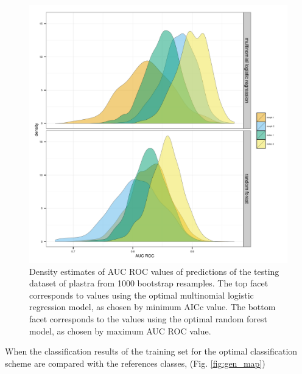 \documentclass[12pt]{article}\usepackage{graphicx, color}
\begin{document}
\begin{figure}[ht]
  \centering
  \includegraphics[width = \textwidth]{figure/gen_res}
  \caption{Density estimates of AUC ROC values of predictions of the testing dataset of plastra from 1000 bootstrap resamples. The top facet corresponds to values using the optimal multinomial logistic regression model, as chosen by minimum AICc value. The bottom facet corresponds to the values using the optimal random forest model, as chosen by maximum AUC ROC value.}
  \label{fig:gen_res}
\end{figure}

When the classification results of the training set for the optimal classification scheme are compared with the references classes, (Fig. \ref{fig:gen_map})
\end{document}
